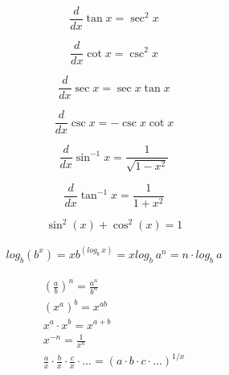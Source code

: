 \documentclass[12pt, english]{article}
\begin{document}
\noindent
{}
\begin{equation}
	\frac{d}{dx} \tan x = \sec^2 x
\end{equation}

\noindent
{}
\begin{equation}
	\frac{d}{dx} \cot x = \csc^2 x
\end{equation}

\noindent
{}
\begin{equation}
	\frac{d}{dx} \sec x = \sec x \tan x
\end{equation}

\noindent
{}
\begin{equation} 
	\frac{d}{dx} \csc x = -\csc x \cot x
\end{equation}

\noindent
{}
\begin{equation}
	\frac{d}{dx} \sin^{-1} x = \frac{1}{\sqrt{1-x^2}}
\end{equation}

\noindent
{}
\begin{equation}
	\frac{d}{dx} \tan^{-1} x = \frac{1}{1+x^2}
\end{equation}

\noindent
{}
\begin{equation}
	\sin ^{2}(x)+\cos ^{2}(x)=1
\end{equation}

\noindent
{}
\begin{equation}
	\begin{aligned}
		log_b (b^x) = x
		b^{(log_{b}\ x)} = x
		log_{b}\ a^n = n \cdot log_b\ a
	\end{aligned}
\end{equation}

\noindent
{}
\begin{equation}
	\begin{aligned}
		\left(\frac{a}{b}\right)^n = \frac{a^n}{b^n} \\
		(x^a)^b = x^{ab} \\
		x^a \cdot x^b = x^{a + b} \\
		x^{-n} = \frac{1}{x^n} \\
		\frac{a}{x} \cdot \frac{b}{x} \cdot \frac{c}{x} \cdot ... = (a \cdot b \cdot c \cdot ...)^{1/x} \\
	\end{aligned}
\end{equation}
\end{document}
